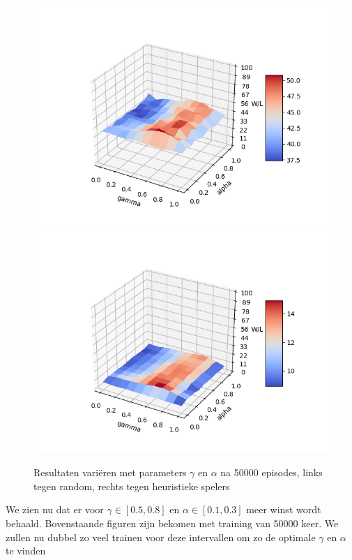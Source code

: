 \documentclass[11pt]{article}
\begin{document}
\begin{figure}[h]
\centering
\includegraphics[scale=0.50]{images/qtable_parameter_random.png}
\includegraphics[scale=0.50]{images/qtable_parameter_heuristic.png}
\caption{Resultaten variëren met parameters $\gamma$ en $\alpha$ na 50000 episodes, links tegen random, rechts tegen heuristieke spelers}
\end{figure}
We zien nu dat er voor $\gamma \in [0.5, 0.8] $ en $\alpha \in [0.1, 0.3] $ meer winst wordt behaald. Bovenstaande figuren zijn bekomen met training van 50000 keer. We zullen nu dubbel zo veel trainen voor deze intervallen om zo de optimale $\gamma$ en $\alpha$ te vinden\\\\
\end{document}
